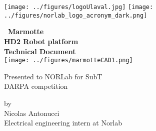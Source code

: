 \thispagestyle{empty}	%
\texttt{[image: ../figures/logoUlaval.jpg]}	%
\hspace{4.5cm}
\texttt{[image: ../figures/norlab\_logo\_acronym\_dark.png]}
\vspace{1cm}	%

\begin{center}	%
{\huge \textbf{\ Marmotte \\ HD2 Robot platform \\ Technical Document}}\\ %
\large
\vspace{1cm}
\texttt{[image: ../figures/marmotteCAD1.png]}
\vspace{1cm}

Presented to NORLab for SubT \\ DARPA competition


\vspace{4cm}
by \\ 
Nicolas Antonucci \\
Electrical engineering intern at Norlab

\vfill	%

{}

\pagebreak
\end{center}